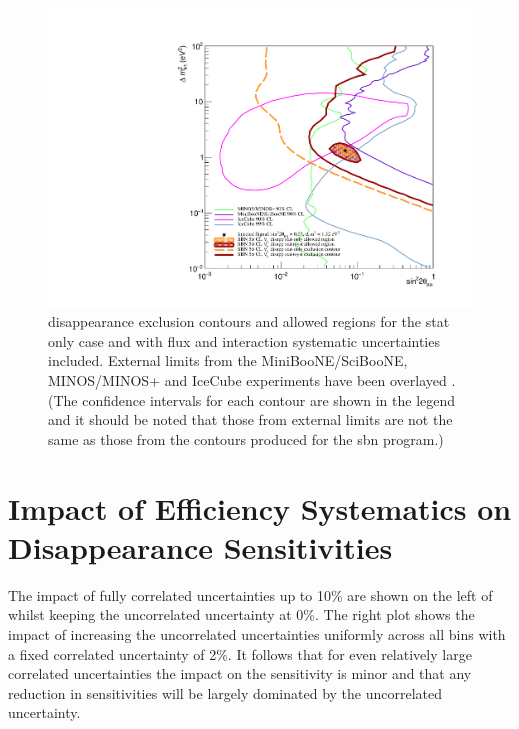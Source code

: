 \begin{figure}[h!]
    \centering
    \includegraphics[width = \largefigwidth]{figures-chap6/overlays/valor_overlays_numu_disapp.pdf}
    \caption[\numu disappearance contours with external limits.]{\numu disappearance exclusion contours and allowed regions for the stat only case and with flux and interaction systematic uncertainties included. External limits from the MiniBooNE/SciBooNE, MINOS/MINOS+ and IceCube experiments have been overlayed \cite{MiniBooNE/SciBooNE_numu_disapp_contour}\cite{MINOS_numu_disapp_contour}\cite{IceCube_numu_disapp_contour}. (The confidence intervals for each contour are shown in the legend and it should be noted that those from external limits are not the same as those from the contours produced for the \gls{sbn} program.)}
    \label{fig:numu_disapp_global_sensitivity}
\end{figure}

\newpage
\section*{\texorpdfstring{Impact of Efficiency Systematics on \numu Disappearance Sensitivities}{Impact of Efficiency Systematics on numu Disappearance Sensitivities}}


The impact of fully correlated uncertainties up to 10\% are shown on the left of  whilst keeping the uncorrelated uncertainty at 0\%. The right plot shows the impact of increasing the uncorrelated uncertainties uniformly across all bins with a fixed correlated uncertainty of 2\%. It follows that for even relatively large correlated uncertainties the impact on the sensitivity is minor and that any reduction in sensitivities will be largely dominated by the uncorrelated uncertainty. 

